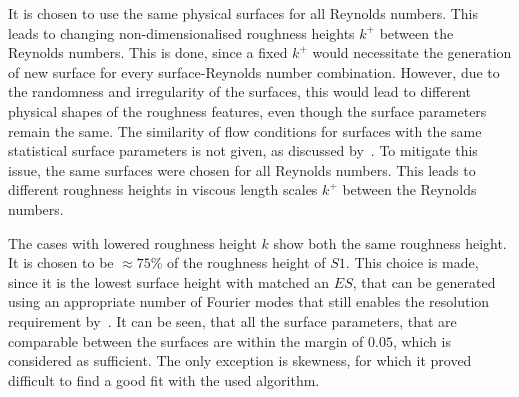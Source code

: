 It is chosen to use the same physical surfaces for all Reynolds numbers.
This leads to changing non-dimensionalised roughness heights $k^+$ between the Reynolds numbers.
This is done, since a fixed $k^+$ would necessitate the generation of new surface for every surface-Reynolds number combination.
However, due to the randomness and irregularity of the surfaces, this would lead to different physical shapes of the roughness features, even though the surface parameters remain the same. 
The similarity of flow conditions for surfaces with the same statistical surface parameters is not given, as discussed by~\cite{forooghiUniversalRoughnessCorrelation2017,chungPredictingDragRough2021}.
To mitigate this issue, the same surfaces were chosen for all Reynolds numbers.
This leads to different roughness heights in viscous length scales $k^+$ between the Reynolds numbers.

The cases with lowered roughness height $k$ show both the same roughness height.
It is chosen to be $\approx 75\%$ of the roughness height of $S1$.
This choice is made, since it is the lowest surface height with matched an $ES$, that can be generated using an appropriate number of Fourier modes that still enables the resolution requirement by~\cite{busseDirectNumericalSimulation2015}.
It can be seen, that all the surface parameters, that are comparable between the surfaces are within the margin of $0.05$, which is considered as sufficient.
The only exception is skewness, for which it proved difficult to find a good fit with the used algorithm.

